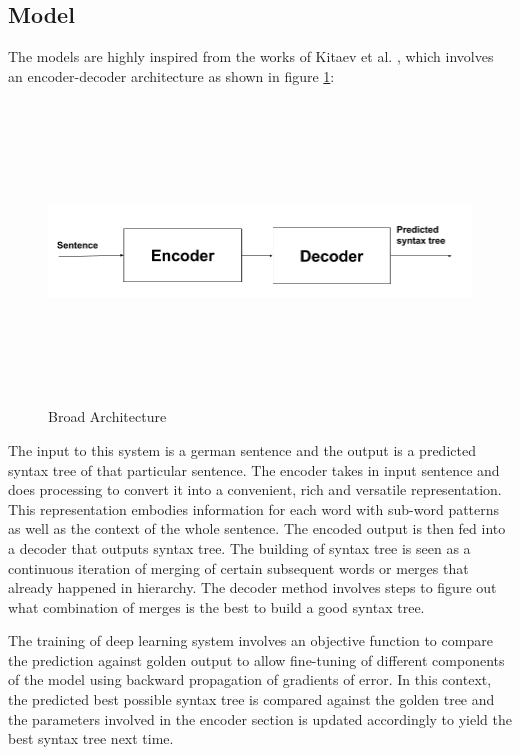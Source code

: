 \documentclass[a4paper, 11pt]{article}
\begin{document}
\subsection{Model}

The models are highly inspired from the works of Kitaev et al. \parencite*{Kitaev2019}, which involves an encoder-decoder architecture as shown in figure \ref{fig:broad_architecture}:

\begin{figure}[htpb]
    \centering
    \includegraphics[width=\textwidth,height=8cm,keepaspectratio=true]
    {encoder-decoder.png}
    \caption{
        Broad Architecture
    }
    \label{fig:broad_architecture}
\end{figure}

The input to this system is a german sentence and the output is a predicted syntax tree of that particular sentence. The encoder takes in input sentence and does processing to convert it into a convenient, rich and versatile representation. This representation embodies information for each word with sub-word patterns as well as the context of the whole sentence. The encoded output is then fed into a decoder that outputs syntax tree. The building of syntax tree is seen as a continuous iteration of merging of certain subsequent words or merges that already happened in hierarchy. The decoder method involves steps to figure out what combination of merges is the best to build a good syntax tree.

The training of deep learning system involves an objective function to compare the prediction against golden output to allow fine-tuning of different components of the model using backward propagation of gradients of error. In this context, the predicted best possible syntax tree is compared against the golden tree and the parameters involved in the encoder section is updated accordingly to yield the best syntax tree next time. 
\end{document}

